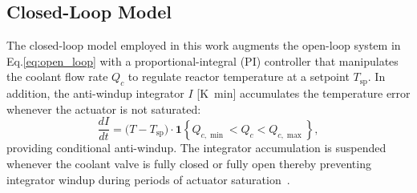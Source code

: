 \documentclass[aps,pre,twocolumn,superscriptaddress,floatfix]{revtex4-2}
\begin{document}
\subsection{Closed-Loop Model}
\label{sec:closed_loop}
The closed-loop model employed in this work augments the open-loop
system in Eq.\eqref{eq:open_loop} with a proportional-integral (PI)
controller that manipulates the coolant flow rate $Q_c$ to regulate
reactor temperature at a setpoint $T_\mathrm{sp}$. In addition, the anti-windup integrator $I$
[K~min] accumulates the temperature error whenever the actuator is not saturated:
\begin{equation}    
\label{eq:closed_loop}
  \frac{dI}{dt} = \bigl(T - T_\mathrm{sp}\bigr)\cdot
       \mathbf{1}\!\left\{Q_{c,\min} < Q_c < Q_{c,\max}\right\},
\end{equation}
providing conditional anti-windup. The integrator accumulation is suspended whenever
the coolant valve is fully closed or fully open thereby preventing integrator
windup during periods of actuator saturation~\citep{Seborg2011}.
\end{document}
